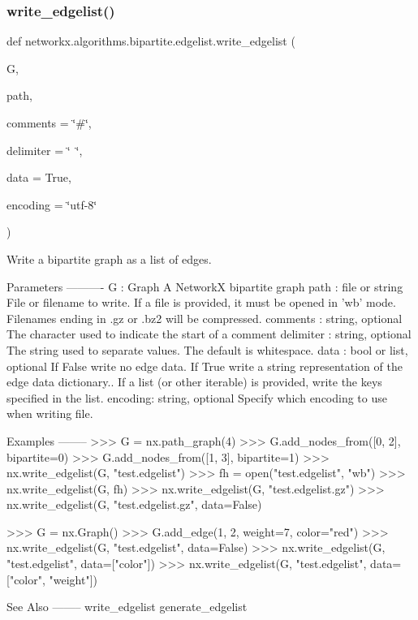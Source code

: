 \subsubsection{\texorpdfstring{write\+\_\+edgelist()}{write\_edgelist()}}
{\footnotesize\ttfamily def networkx.\+algorithms.\+bipartite.\+edgelist.\+write\+\_\+edgelist (\begin{DoxyParamCaption}\item[{}]{G,  }\item[{}]{path,  }\item[{}]{comments = {\ttfamily \char`\"{}\#\char`\"{}},  }\item[{}]{delimiter = {\ttfamily \char`\"{}~\char`\"{}},  }\item[{}]{data = {\ttfamily True},  }\item[{}]{encoding = {\ttfamily \char`\"{}utf-\/8\char`\"{}} }\end{DoxyParamCaption})}

\begin{DoxyVerb}Write a bipartite graph as a list of edges.

Parameters
----------
G : Graph
   A NetworkX bipartite graph
path : file or string
   File or filename to write. If a file is provided, it must be
   opened in 'wb' mode. Filenames ending in .gz or .bz2 will be compressed.
comments : string, optional
   The character used to indicate the start of a comment
delimiter : string, optional
   The string used to separate values.  The default is whitespace.
data : bool or list, optional
   If False write no edge data.
   If True write a string representation of the edge data dictionary..
   If a list (or other iterable) is provided, write the  keys specified
   in the list.
encoding: string, optional
   Specify which encoding to use when writing file.

Examples
--------
>>> G = nx.path_graph(4)
>>> G.add_nodes_from([0, 2], bipartite=0)
>>> G.add_nodes_from([1, 3], bipartite=1)
>>> nx.write_edgelist(G, "test.edgelist")
>>> fh = open("test.edgelist", "wb")
>>> nx.write_edgelist(G, fh)
>>> nx.write_edgelist(G, "test.edgelist.gz")
>>> nx.write_edgelist(G, "test.edgelist.gz", data=False)

>>> G = nx.Graph()
>>> G.add_edge(1, 2, weight=7, color="red")
>>> nx.write_edgelist(G, "test.edgelist", data=False)
>>> nx.write_edgelist(G, "test.edgelist", data=["color"])
>>> nx.write_edgelist(G, "test.edgelist", data=["color", "weight"])

See Also
--------
write_edgelist
generate_edgelist
\end{DoxyVerb}
 

